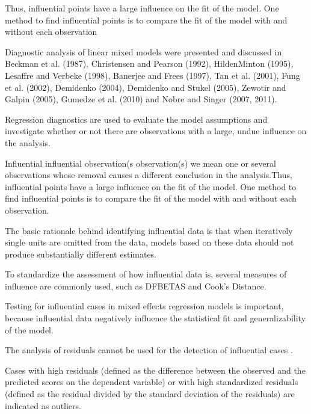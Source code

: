Thus, influential points have a large influence on the fit of the model. One method to find influential points is to compare the fit of the model with and without each observation

Diagnostic analysis of linear mixed models were
presented and discussed in Beckman et al. (1987), Christensen and Pearson (1992), HildenMinton
(1995), Lesaffre and Verbeke (1998), Banerjee and Frees (1997), Tan et al. (2001),
Fung et al. (2002), Demidenko (2004), Demidenko and Stukel (2005), Zewotir and Galpin
(2005), Gumedze et al. (2010) and Nobre and Singer (2007, 2011).





Regression diagnostics are used to evaluate the model assumptions and investigate whether or not there are observations with a large, undue influence on the analysis.

Influential influential observation(s observation(s) we mean one or several observations whose
removal causes a different conclusion in the analysis.Thus, influential points have a large influence on the fit of the model. One method to find influential points is to compare the fit of the model with and without each observation.


The basic rationale behind identifying influential data is that when iteratively single units are omitted from the data, models based on these data should not produce substantially different estimates. 

To standardize the assessment of how influential data is, several measures of influence are commonly used, such as DFBETAS 
and Cook’s Distance.

Testing for influential cases in mixed effects regression models is important, because influential data negatively 
influence the statistical fit and generalizability of the model.


The analysis of residuals cannot be used for the detection of influential cases \citep{crawley2012r}. 

Cases with high residuals (defined as the difference between the observed and the predicted scores on the dependent
variable) or with high standardized residuals (defined as the residual divided by the standard deviation
of the residuals) are indicated as outliers.

